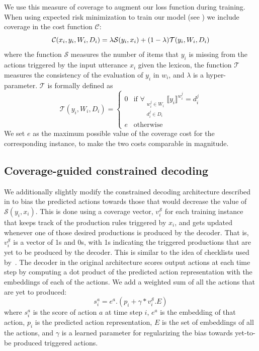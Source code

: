 We use this measure of coverage to augment our loss function during training.
When using expected risk minimization to train our model (see )
we include coverage in the cost function $\mathcal{C}$:
\begin{equation}
	\mathcal{C}(x_i, y_i, W_i, D_i) = \lambda \mathcal{S}(y_i, x_i) + \\
		(1 - \lambda)\mathcal{T}(y_i, W_i, D_i)
		\label{eq:cost}
\end{equation}
where the function $\mathcal{S}$ measures the number of items that $y_i$ is
missing from the actions triggered by the input utterance $x_i$ given the
lexicon, the function $\mathcal{T}$ measures the consistency of the evaluation
of $y_i$ in $w_i$, and $\lambda$ is a hyper-parameter.  $\mathcal{T}$ is
formally defined as
\begin{equation}
	\mathcal{T}(y_i, W_i, D_i) = \begin{cases}
		0 &\text{if } \forall_{\substack{w^j_i \in W_i\\d^j_i \in D_i}} \llbracket y_i \rrbracket^{w^j_i} = d^j_i\\
		e &\text{otherwise}
	\end{cases}
	\label{eq:consistency}
\end{equation}
We set $e$ as the maximum possible value of the coverage cost for the corresponding instance, to make the two costs comparable in magnitude.

\subsection{Coverage-guided constrained decoding}
We additionally slightly modify the constrained decoding architecture described
in  to bias the predicted actions towards those
that would decrease the value of $\mathcal{S}(y_i, x_i)$. This is done using a
coverage vector, $v^{\mathcal{S}}_i$ for each training instance that keeps track
of the production rules triggered by $x_i$, and gets updated whenever one of
those desired productions is produced by the decoder. That is,
$v^{\mathcal{S}}_i$ is a vector of 1s and 0s, with 1s indicating the triggered
productions that are yet to be produced by the decoder. This is similar to the
idea of checklists used by~\citet{kiddon2016globally}. The decoder in the
original architecture scores output actions at each time step by computing a dot
product of the predicted action representation with the embeddings of each of
the actions. We add a weighted sum of all the actions that are yet to produced:
\begin{equation}
	s^a_i = e^a . (p_i + \gamma * v^{\mathcal{S}}_i . E)
\end{equation}
where $s^a_i$ is the score of action $a$ at time step $i$, $e^a$ is the
embedding of that action, $p_i$ is the predicted action representation, $E$ is
the set of embeddings of all the actions, and $\gamma$ is a learned parameter
for regularizing the bias towards yet-to-be produced triggered actions.

